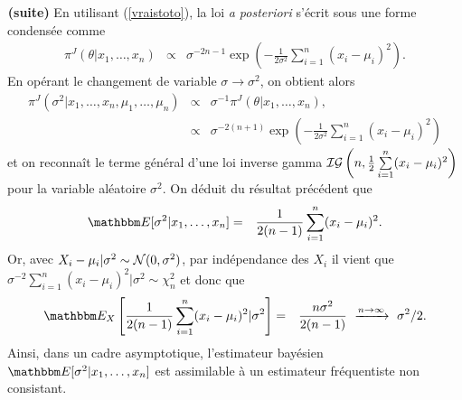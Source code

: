 \begin{rep}${}^{}${\bf (suite)}
En utilisant (\ref{vraistoto}), la loi {\it a posteriori} s'écrit sous une forme condensée comme 
\begin{eqnarray*}
\pi^J(\theta|x_1,\ldots,x_n) & \propto & \sigma^{-2n-1} \exp\left(-\frac{1}{2\sigma^2}\sum\limits_{i=1}^n (x_i-\mu_i)^2\right).
\end{eqnarray*}
En opérant le changement de variable $\sigma \to \sigma^2$, on obtient alors
\begin{eqnarray*}
\pi^J(\sigma^2|x_1,\ldots,x_n,\mu_1,\ldots,\mu_n) & \propto & \sigma^{-1} \pi^J(\theta|x_1,\ldots,x_n), \\
& \propto &  \sigma^{-2(n+1)} \exp\left(-\frac{1}{2\sigma^2}\sum\limits_{i=1}^n (x_i-\mu_i)^2\right)
\end{eqnarray*}
et on reconnaît le terme général  d'une loi inverse gamma ${\cal{IG}}\left(n,\frac{1}{2}\sum\limits_{i=1}^n (x_i-\mu_i)^2\right)$ pour la variable aléatoire $\sigma^2$. On déduit du résultat précédent que
\begin{eqnarray*}
\E[\sigma^2|x_1,\ldots,x_n] & =  & \frac{1}{2(n-1)}\sum\limits_{i=1}^n (x_i-\mu_i)^2.
\end{eqnarray*}
Or, avec $X_i-\mu_i|\sigma^2\sim{\cal{N}}(0,\sigma^2)$, par indépendance des $X_i$ il vient que $\sigma^{-2}\sum_{i=1}^n (x_i-\mu_i)^2|\sigma^2 \sim \chi^2_{n}$ et donc que 
\begin{eqnarray*}
\E_X\left[\frac{1}{2(n-1)}\sum\limits_{i=1}^n (x_i-\mu_i)^2|\sigma^2\right] & = & \frac{n \sigma^2}{2(n-1)} \ \xrightarrow[]{n\to\infty} \ \sigma^2/2.
\end{eqnarray*}
Ainsi, dans un cadre asymptotique, l'estimateur bayésien $\E[\sigma^2|x_1,\ldots,x_n]$ est assimilable à un estimateur fréquentiste non consistant. 
\end{rep}